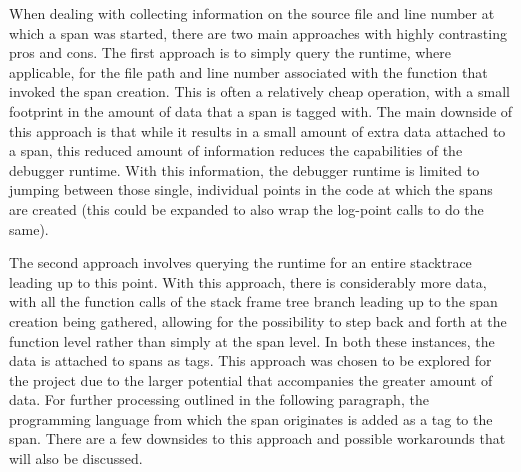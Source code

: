 \documentclass[12pt,pdftex,titlepage]{report}
\begin{document}
                When dealing with collecting information on the source file and line number at which a span was started, there are two main approaches with highly contrasting pros and cons.
                The first approach is to simply query the runtime, where applicable, for the file path and line number associated with the function that invoked the span creation. This is often
                a relatively cheap operation, with a small footprint in the amount of data that a span is tagged with. The main downside of this approach is that while it results in a small 
                amount of extra data attached to a span, this reduced amount of information reduces the capabilities of the debugger runtime. With this information, the debugger runtime is
                limited to jumping between those single, individual points in the code at which the spans are created (this could be expanded to also wrap the log-point calls to do the same).
                
                The second approach involves querying the runtime for an entire stacktrace leading up to this point. With this approach, there is considerably more data, with all the function
                calls of the stack frame tree branch leading up to the span creation being gathered, allowing for the possibility to step back and forth at the function level rather than simply
                at the span level. In both these instances, the data is attached to spans as tags. This approach was chosen to be explored for the project due to the larger potential that accompanies
                the greater amount of data. For further processing outlined in the following paragraph, the programming language from which the span originates is added as a tag to the span.
                There are a few downsides to this approach and possible workarounds that will also be discussed.
                
\end{document}
